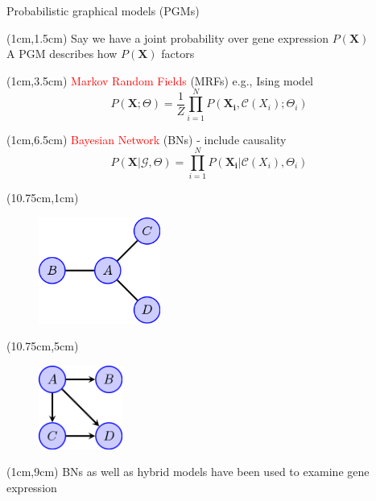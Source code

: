 \documentclass[aspectratio=1610]{beamer}					%
\begin{document}
\begin{frame}{Probabilistic graphical models (PGMs)}

\begin{textblock*}{10cm}(1cm,1.5cm)
Say we have a joint probability over gene expression $P(\bm{X})$\\A PGM describes how $P(\bm{X})$ factors\\
\end{textblock*}

\begin{textblock*}{9cm}(1cm,3.5cm)
\textcolor{red}{Markov Random Fields} (MRFs) e.g., Ising model
\begin{equation*}
P(\bm{X};\Theta) = \frac{1}{Z}\prod_{i=1}^{N}P(\bm{X_{i}},\mathcal{C}(X_{i});\Theta_{i})
\end{equation*}
\end{textblock*}

\begin{textblock*}{7cm}(1cm,6.5cm)
\textcolor{red}{Bayesian Network} (BNs) - include causality
\begin{equation*}
P(\bm{X}|\mathcal{G},\Theta) = \prod_{i=1}^{N}P(\bm{X_{i}}|\mathcal{C}(X_{i}),\Theta_{i})
\end{equation*}
\end{textblock*}


\begin{textblock*}{5cm}(10.75cm,1cm)
\begin{figure}
\includegraphics[width=4cm]{mrf.png}
\end{figure}
\end{textblock*}

\begin{textblock*}{5cm}(10.75cm,5cm)
\begin{figure}
\includegraphics[width=2.75cm]{bayes-net.png}
\end{figure}
\end{textblock*}

\begin{textblock*}{15cm}(1cm,9cm)
BNs as well as hybrid models have been used to examine gene expression
\end{textblock*}

\end{frame}
\end{document}
